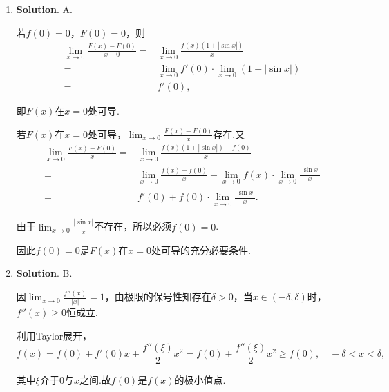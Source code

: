 \documentclass[../Main.tex]{subfiles}
\begin{document}
\begin{enumerate}
    \item \textbf{Solution}. A.

      若$f(0)=0$，$F(0)=0$，则
      \[
        \begin{aligned}
          \lim_{x\to0}\frac{F(x)-F(0)}{x-0}= & \lim_{x\to0}\frac{f(x)(1+|\sin x|)}{x}                    \\
          =                                  & \lim_{x\to0}f'(0)\cdot\lim_{x\to0}\left(1+|\sin x|\right) \\
          =                                  & f'(0),
        \end{aligned}
      \]

      即$F(x)$在$x=0$处可导.

      若$F(x)$在$x=0$处可导，$\lim_{x\to0}\frac{F(x)-F(0)}{x}$存在.又
      \[
        \begin{aligned}
          \lim_{x\to0}\frac{F(x)-F(0)}{x}= & \lim_{x\to0}\frac{f(x)(1+|\sin x|)-f(0)}{x}                                         \\
          =                                & \lim_{x\to0}\frac{f(x)-f(0)}{x}+\lim_{x\to0}f(x)\cdot\lim_{x\to0}\frac{|\sin x|}{x} \\
          =                                & f'(0)+f(0)\cdot\lim_{x\to0}\frac{|\sin x|}{x}.
        \end{aligned}
      \]

      由于$\lim_{x\to0}\frac{|\sin x|}{x}$不存在，所以必须$f(0)=0$.

      因此$f(0)=0$是$F(x)$在$x=0$处可导的充分必要条件.

    \item \textbf{Solution}. B.

      因$\lim_{x\to0}\frac{f''(x)}{|x|}=1$，由极限的保号性知存在$\delta>0$，当$x\in
      (-\delta,\delta)$时，$f''(x)\geq0$恒成立.

      利用Taylor展开，
      \[
        f(x)=f(0)+f'(0)x+\frac{f''(\xi)}{2}x^{2}=f(0)+\frac{f''(\xi)}{2}x^{2} \geq
        f(0), \quad -\delta<x<\delta,
      \]

      其中$\xi$介于$0$与$x$之间.故$f(0)$是$f(x)$的极小值点.
  \end{enumerate}
\end{document}
